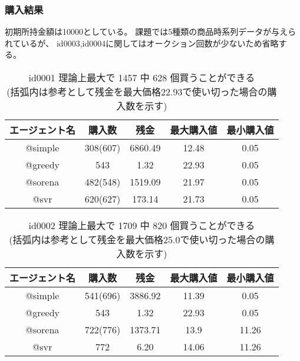 \documentclass[]{jsarticle}
\begin{document}
\subsubsection{購入結果}
初期所持金額は10000としている。
課題では5種類の商品時系列データが与えられているが、
id0003,id0004に関してはオークション回数が少ないため省略する。
\begin{table}[htb]\begin{center}
  \caption{id0001 理論上最大で 1457 中 628 個買うことができる \\
            (括弧内は参考として残金を最大価格22.93で使い切った場合の購入数を示す)}
  \begin{tabular}{|c|c|c|c|c|} \hline
    エージェント名 & 購入数 & 残金 & 最大購入値 & 最小購入値 \\ \hline \hline
    @simple & 308(607) & 6860.49 & 12.48 & 0.05 \\ \hline
    @greedy & 543 & 1.32 & 22.93 & 0.05 \\ \hline
    @sorena & 482(548) & 1519.09 & 21.97 & 0.05 \\ \hline
    @svr & 620(627) & 173.14 & 21.73 & 0.05 \\ \hline
  \end{tabular}
\end{center} \end{table}

\begin{table}[htb]\begin{center}
  \caption{id0002 理論上最大で 1709 中 820 個買うことができる \\
            (括弧内は参考として残金を最大価格25.0で使い切った場合の購入数を示す)}
  \begin{tabular}{|c|c|c|c|c|} \hline
    エージェント名 & 購入数 & 残金 & 最大購入値 & 最小購入値 \\ \hline \hline
    @simple & 541(696) & 3886.92 & 11.39 & 0.05 \\ \hline
    @greedy & 543 & 1.32 & 22.93 & 0.05 \\ \hline
    @sorena & 722(776) & 1373.71 & 13.9 & 11.26 \\ \hline
    @svr & 772 & 6.20 & 14.06 & 11.26 \\ \hline
  \end{tabular}
\end{center} \end{table}
\end{document}
